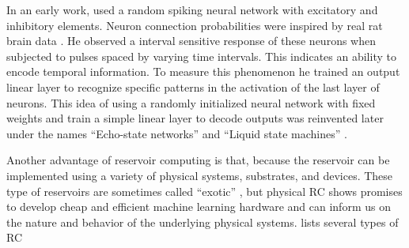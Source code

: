 In an early work, \textcite{buonomanoTemporalInformationTransformed1995} used a
random spiking neural network with excitatory and inhibitory elements. Neuron
connection probabilities were inspired by real rat brain data
\parencite{masonSynapticTransmissionIndividual1991}. He observed a interval
sensitive response of these neurons when subjected to pulses spaced by varying
time intervals. This indicates an ability to encode temporal information. To
measure this phenomenon he trained an output linear layer to recognize specific
patterns in the activation of the last layer of neurons. This idea of using a
randomly initialized neural network with fixed weights and train a simple linear
layer to decode outputs was reinvented later under the names ``Echo-state
networks'' \parencite{jaegerEchoStateApproach2001} and ``Liquid state machines''
\parencite{maassRealTimeComputingStable2002}.

Another advantage of reservoir computing is that, because the reservoir can be
implemented using a variety of physical systems, substrates, and devices. These
type of reservoirs are sometimes called ``exotic''
\parencite{lukoseviciusReservoirComputingApproaches2009}, but physical \ac{RC}
shows promises to develop cheap and efficient machine learning hardware and can
inform us on the nature and behavior of the underlying physical systems.
\textcite{tanakaRecentAdvancesPhysical2019} lists several types of \ac{RC}

